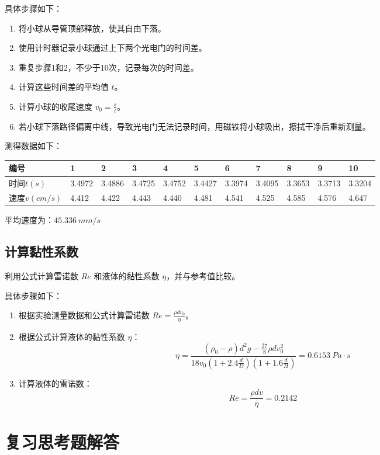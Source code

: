 \documentclass[UTF8]{ctexart}
\begin{document}
具体步骤如下：
\begin{enumerate}
    \item 将小球从导管顶部释放，使其自由下落。
    \item 使用计时器记录小球通过上下两个光电门的时间差。
    \item 重复步骤1和2，不少于10次，记录每次的时间差。
    \item 计算这些时间差的平均值 \(t\)。
    \item 计算小球的收尾速度 \(v_0 = \frac{s}{t}\)。
    \item 若小球下落路径偏离中线，导致光电门无法记录时间，用磁铁将小球吸出，擦拭干净后重新测量。
\end{enumerate}
测得数据如下：
\begin{table}[H]
    \centering
    \begin{tabular}{l|llllllllll}
    \toprule
    编号&1&2&3&4&5&6&7&8&9&10\\
    \midrule
    时间$t(s)$&3.4972&3.4886&3.4725&3.4752&3.4427&3.3974&3.4095&3.3653&3.3713&3.3204\\
    速度$v(cm/s)$&4.412&4.422&4.443&4.440&4.481&4.541&4.525&4.585&4.576&4.647\\
    \bottomrule
    \end{tabular}
\end{table}

平均速度为：$45.336\ mm/s$

\subsection{计算黏性系数}
利用公式计算雷诺数 \(Re\) 和液体的黏性系数 \(\eta\)，并与参考值比较。

具体步骤如下：
\begin{enumerate}
    \item 根据实验测量数据和公式计算雷诺数 \(Re = \frac{\rho d v_0}{\eta}\)。
    \item 根据公式计算液体的黏性系数 \(\eta\)：
    \[
    \eta = \frac{(\rho_0 - \rho) d^2 g - \frac{27}{8} \rho d v_0^2}{18 v_0 \left(1 + 2.4 \frac{d}{D}\right) \left(1 + 1.6 \frac{d}{H}\right)} = 0.6153\ Pa\cdot s
    \]
    \item 计算液体的雷诺数：
    \[
        Re = \frac{\rho d v}{\eta}=0.2142
        \]
\end{enumerate}

\section{复习思考题解答}
\end{document}
